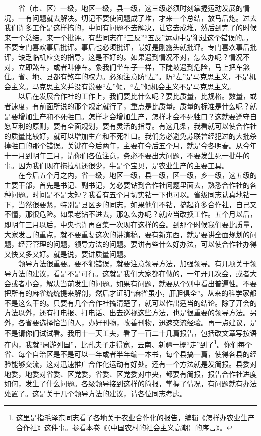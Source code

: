 \documentclass[cn,11pt,chinese]{elegantbook}
\begin{document}
　　省（市、区）一级，地区一级，县一级，这三级必须时刻掌握运动发展的情况，一有问题就去解决。切记不要使问题成了堆，才来一个总结，放马后炮。过去我们许多工作是这样搞的，中间有问题不去解决，让它去成堆，然后到完了的时候来一个总结，来一个批评。有些同志在“三反”“五反”运动中是犯过这个错误的。，不要专门喜欢事后批评。事后也必须批评，最好是刚露头就批评。专门喜欢事后批评，缺乏临机应变的指导，这是不好的。如果遇到情况不对，怎么办呢？情况不对，立即煞车，或者叫停车。象我们坐车子一样，下陡坡遇到危险，马上把车煞住。省、地、县都有煞车的权力。必须注意防“左”。防“左”是马克思主义，不是机会主义。马克思主义并没有说要“左”倾，“左”倾机会主义不是马克思主义。\\
　　以后在发展合作社的工作上，我们要比什么呢？要比质量，比规格。数量，或者速度，有前面所说的那个规定就行了，重点是比质量。质量的标准是什么呢？就是要增加生产和不死牲口。怎样才会增加生产，怎样才会不死牲口？这就要遵守自愿互利的原则，要有全面规划，要有灵活的指导。有这几条，我看就可以使合作社的质量比较好，就可以增加生产和不死牲口。我们务必避免苏联曾经犯过的大批杀掉牲口的那个错误。关键在今后两年，主要在今后五个月，就是今冬明春。从今年十一月到明年三月，请你们各位注意，务必不要出大问题，不要发生死一批牛的事。因为我们现在拖拉机还很少，牛是个宝贝，是农业生产的主要工具。\\
　　在今后五个月之内，省一级，地区一级，县一级，区一级，乡一级，这五级的主要干部，首先是书记、副书记，务必要钻到合作社问题里面去，熟悉合作社的各种问题。时间是不是太短？我看有五个月切实钻一下也可以。省级同志认真地钻一下，当然很要紧，特别是县区乡的同志，如果他们不钻，搞起许多合作社，自己又不懂，那很危险。如果老钻不进去，那怎么办呢？就应当改换工作。五个月以后，即明年三月以后，中央也许再召集一次现在这样的会。到那个时候我们要比质量，大家发言的重点，就不要重复这次的讲演稿，要有新东西，就是要讲全面规划的问题，经营管理的问题，领导方法的问题。要讲有些什么好办法，可以使合作社办得又快又多又好。就是说，要讲质量问题。\\
　　领导方法很重要。要不犯错误，就要注意领导方法，加强领导。有几项关于领导方法的建议，看是不是可行。这就是我们大家都在做的，一年开几次会，或者大会或者小会，解决当前发生的问题。如果有问题，就要从个别中看出普遍性。不要把所有的麻雀统统提来解剖，然后才证明“麻雀虽小，肝胆俱全”。从来的科学家都不是这么干的。只要有几个合作社搞清楚了，就可以作出适当的结论。除了开会的方法以外，还有打电报、打电话、出去巡视这些方法，也是很重要的领导方法。另外，各省要选择恰当的人，办好刊物，改善刊物，迅速交流经验。再一点建议，是不是请你们试试看。我用十一天工夫，看了一百二十几篇报告，包括改文章写按语在内，我就“周游列国”，比孔夫子走得宽，云南、新疆一概“走”到了\footnote[2]{这里是指毛泽东同志看了各地关于农业合作化的报告，编辑《怎样办农业生产合作社》这件事。参看本卷《（中国农村的社会主义高潮）的序言》。}。你们每个省、每个自治区是不是可以一年或者半年编一本书，每个县搞一篇，使得各县的经验能够交流，这对迅速推广合作化运动有好处。还有一个方法就是发简报。县委对地委，地委对省委、区党委，省委、区党委对中央，都要有简报，报告合作社进度如何，发生了什么问题。各级领导接到这样的简报，掌握了情况，有问题就有办法处置了。这是关于几个领导方法的建议，请各位同志考虑。\\
\end{document}
